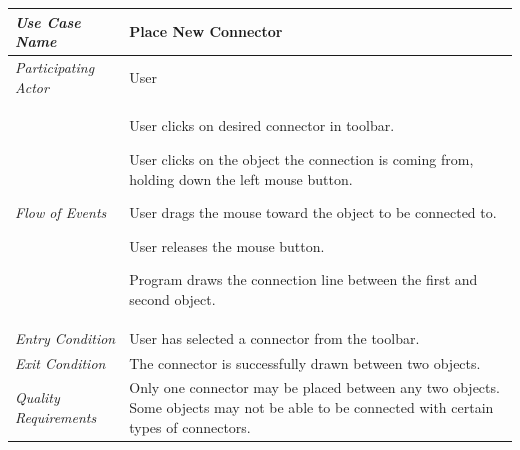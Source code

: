 \documentclass[twoside,letterpaper]{article}
\newenvironment{my_enumerate}{
\begin{enumerate}
  \setlength{\itemsep}{1pt}
  \setlength{\parskip}{0pt}
  \setlength{\parsep}{0pt}}{\end{enumerate}
}
\begin{document}
\begin{flushleft}
\tablehead{}
\begin{tabular}{|m{2.0in} m{5.0in}|}
\hline 
  {\bfseries\emph{Use Case Name}} 
  & {\bfseries Place New Connector}
\\\hline
  \emph{Participating Actor} 
  & User
\\\hline
\emph{Flow of Events}
& \begin{my_enumerate}
\item User clicks on desired connector in toolbar.
\item User clicks on the object the connection is coming from, holding down the left mouse button.
\item User drags the mouse toward the object to be connected to.
\item User releases the mouse button.
\item Program draws the connection line between the first and second object.
\end{my_enumerate}
\\\hline
  \emph{Entry Condition}
  & User has selected a connector from the toolbar.
\\\hline
  \emph{Exit Condition}
  & The connector is successfully drawn between two objects. 
\\\hline
  \emph{Quality Requirements}
  & Only one connector may be placed between any two objects. Some objects may not be able to be connected with certain types of connectors.
\\\hline
\end{tabular}
\end{flushleft}
\bigskip
\end{document}
